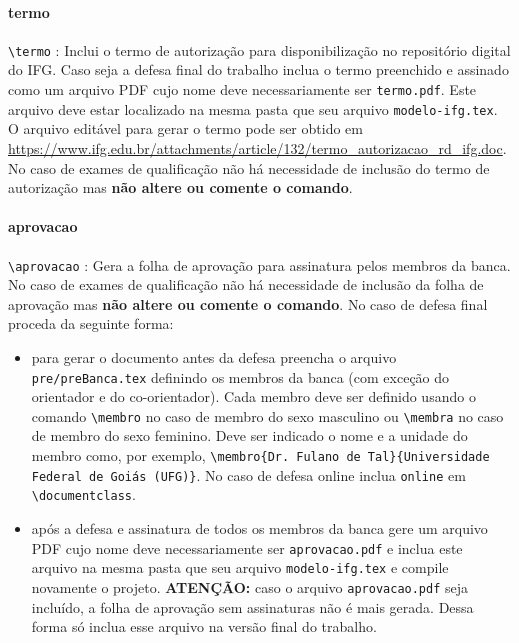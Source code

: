 \paragraph{termo\\}
\verb|\termo| : Inclui o termo de autorização para disponibilização no repositório digital do IFG. Caso seja a defesa final do trabalho inclua o termo preenchido e assinado como um arquivo PDF cujo nome deve necessariamente ser \verb|termo.pdf|. Este arquivo deve estar localizado na mesma pasta que seu arquivo \verb|modelo-ifg.tex|. O arquivo editável para gerar o termo pode ser obtido em \url{https://www.ifg.edu.br/attachments/article/132/termo\_autorizacao\_rd\_ifg.doc}. No caso de exames de qualificação não há necessidade de inclusão do termo de autorização mas \textbf{não altere ou comente o comando}.

\paragraph{aprovacao\\}
\verb|\aprovacao| : Gera a folha de aprovação para assinatura pelos membros da banca. No caso de exames de qualificação não há necessidade de inclusão da folha de aprovação mas \textbf{não altere ou comente o comando}. No caso de defesa final proceda da seguinte forma: 

\begin{itemize}
\item para gerar o documento antes da defesa preencha o arquivo \verb|pre/preBanca.tex| definindo os membros da banca (com exceção do orientador e do co-orientador). Cada membro deve ser definido usando o comando \verb|\membro| no caso de membro do sexo masculino ou \verb|\membra| no caso de membro do sexo feminino. Deve ser indicado o nome e a unidade do membro como, por exemplo, \verb|\membro{Dr. Fulano de Tal}{Universidade Federal de Goiás (UFG)}|. No caso de defesa online inclua \verb|online| em \verb|\documentclass|.
\item após a defesa e assinatura de todos os membros da banca gere um arquivo PDF cujo nome deve necessariamente ser \verb|aprovacao.pdf| e inclua este arquivo na mesma pasta que seu arquivo \verb|modelo-ifg.tex| e compile novamente o projeto. \textbf{ATENÇÃO:}  caso o arquivo \verb|aprovacao.pdf| seja incluído, a folha de aprovação sem assinaturas não é mais gerada. Dessa forma só inclua esse arquivo na versão final do trabalho.
\end{itemize}

